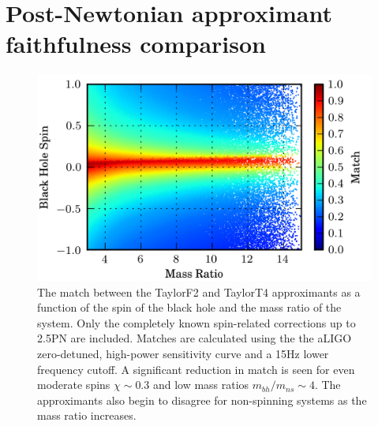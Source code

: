 \section{Post-Newtonian approximant faithfulness comparison}
\label{sec:faithfulness}

\begin{figure}
\includegraphics{papers/nsbh_faithfulness/figure2.png}

\caption{\label{fig:f2f4f}The match between the TaylorF2 and
TaylorT4 approximants as a function of the spin of the black hole
and the mass ratio of the system. Only the completely known 
spin-related corrections up to 2.5\ac{PN} are included. Matches are calculated using the
the aLIGO zero-detuned, high-power sensitivity curve and a 15Hz lower frequency cutoff.
A significant reduction in match is seen for even moderate spins $\chi \sim 0.3$
and low mass ratios $m_{bh}/m_{ns} \sim 4$. The approximants also begin to disagree for non-spinning
systems as the mass ratio increases.
}


\end{figure}

